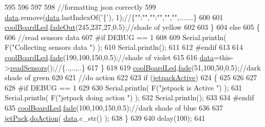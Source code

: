 \begin{DoxyCode}
595 
596         
597 
598         \textcolor{comment}{//formatting json correctly}
599         \hyperlink{class_cool_board_a427fb753dd8575bdf821c70a5c63d695}{data}.remove(\hyperlink{class_cool_board_a427fb753dd8575bdf821c70a5c63d695}{data}.lastIndexOf(\textcolor{charliteral}{'\{'}), 1);\textcolor{comment}{//\{"":"","":"","","",.......\}}
600 
601         \hyperlink{class_cool_board_a1b1d3c684a5baa56b08486e192fd8e97}{coolBoardLed}.\hyperlink{class_cool_board_led_a93d545679237e8cc858324367149775c}{fadeOut}(245,237,27,0.5);\textcolor{comment}{//shade of yellow}
602                 
603     \}   
604     \textcolor{keywordflow}{else}
605     \{
606         \textcolor{comment}{//read sensors data}
607 \textcolor{preprocessor}{    #if DEBUG == 1}
608 
609         Serial.println( F(\textcolor{stringliteral}{"Collecting sensors data "}) );
610         Serial.println();
611 
612 \textcolor{preprocessor}{    #endif}
613 
614         \hyperlink{class_cool_board_a1b1d3c684a5baa56b08486e192fd8e97}{coolBoardLed}.\hyperlink{class_cool_board_led_af1cacbaa88db8bcf6042c1083ba41155}{fade}(190,100,150,0.5);\textcolor{comment}{//shade of violet        }
615 
616         \hyperlink{class_cool_board_a427fb753dd8575bdf821c70a5c63d695}{data}=this->\hyperlink{class_cool_board_ad03abdce2e65f520bbf2cff0f2d083cf}{readSensors}();\textcolor{comment}{//\{..,..,..\}}
617     \}
618 
619     \hyperlink{class_cool_board_a1b1d3c684a5baa56b08486e192fd8e97}{coolBoardLed}.\hyperlink{class_cool_board_led_af1cacbaa88db8bcf6042c1083ba41155}{fade}(51,100,50,0.5);\textcolor{comment}{//dark shade of green  }
620 
621     \textcolor{comment}{//do action}
622 
623     \textcolor{keywordflow}{if} (\hyperlink{class_cool_board_a9be03a913d26e558328935ca3b59a75e}{jetpackActive})
624     \{
625     
626 
627 
628 \textcolor{preprocessor}{    #if DEBUG == 1}
629 
630         Serial.println( F(\textcolor{stringliteral}{"jetpack is Active "}) );
631         Serial.println( F(\textcolor{stringliteral}{"jetpack doing action "}) );
632         Serial.println();
633     
634 \textcolor{preprocessor}{    #endif}
635         \hyperlink{class_cool_board_a1b1d3c684a5baa56b08486e192fd8e97}{coolBoardLed}.\hyperlink{class_cool_board_led_af1cacbaa88db8bcf6042c1083ba41155}{fade}(100,100,150,0.5);\textcolor{comment}{//dark shade of blue }
636     
637         \hyperlink{class_cool_board_a30b1357881b01ccbec676856a91e48e9}{jetPack}.\hyperlink{class_jetpack_a9e703197093094b963f9ad57817495b8}{doAction}( \hyperlink{class_cool_board_a427fb753dd8575bdf821c70a5c63d695}{data}.c\_str() );
638     \}
639     
640     delay(100);
641 

\end{DoxyCode}
